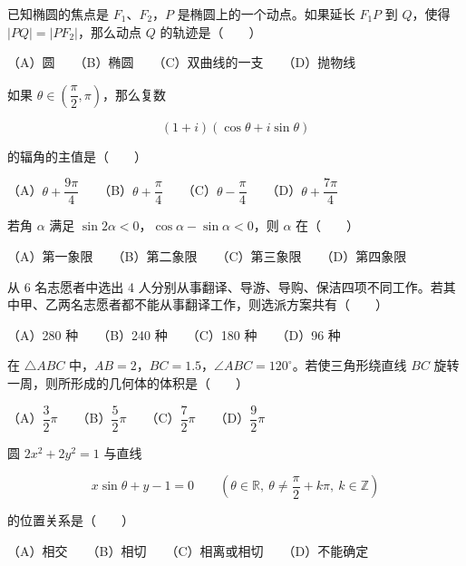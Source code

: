 \begin{question}
已知椭圆的焦点是 $F_1\text{、}F_2$，$P$ 是椭圆上的一个动点。如果延长 $F_1P$ 到 $Q$，使得 $|PQ|=|PF_2|$，那么动点 $Q$ 的轨迹是\mbox{（　　）}

（A）圆　　（B）椭圆　　（C）双曲线的一支　　（D）抛物线

\end{question}
\begin{question}
如果 $\theta\in\left(\dfrac\pi2,\pi\right)$，那么复数

\nopagebreak[4]
\[
(1+i)(\cos\theta+i\sin\theta)
\]

的辐角的主值是\mbox{（　　）}

（A）$\theta+\dfrac{9\pi}{4}$　　（B）$\theta+\dfrac\pi4$　　（C）$\theta-\dfrac\pi4$　　（D）$\theta+\dfrac{7\pi}{4}$

\end{question}
\begin{question}
若角 $\alpha$ 满足 $\sin2\alpha<0$，$\cos\alpha-\sin\alpha<0$，则 $\alpha$ 在\mbox{（　　）}

（A）第一象限　　（B）第二象限　　（C）第三象限　　（D）第四象限

\end{question}
\begin{question}
从 6 名志愿者中选出 4 人分别从事翻译、导游、导购、保洁四项不同工作。若其中甲、乙两名志愿者都不能从事翻译工作，则选派方案共有\mbox{（　　）}

（A）280 种　　（B）240 种　　（C）180 种　　（D）96 种

\end{question}
\begin{question}
在 $\triangle ABC$ 中，$AB=2$，$BC=1.5$，$\angle ABC=120^\circ$。若使三角形绕直线 $BC$ 旋转一周，则所形成的几何体的体积是\mbox{（　　）}

（A）$\dfrac32\pi$　　（B）$\dfrac52\pi$　　（C）$\dfrac72\pi$　　（D）$\dfrac92\pi$

\end{question}
\begin{question}
圆 $2x^2+2y^2=1$ 与直线

\nopagebreak[4]
\[
x\sin\theta+y-1=0
\qquad\left(\theta\in\mathbb R,\ \theta\ne\frac\pi2+k\pi,\ k\in\mathbb Z\right)
\]

的位置关系是\mbox{（　　）}

（A）相交　　（B）相切　　（C）相离或相切　　（D）不能确定

\end{question}
